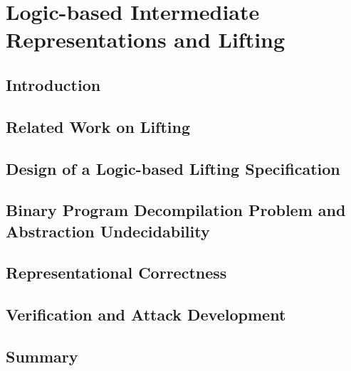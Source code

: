 \chapter{Logic-based Intermediate Representations and Lifting}

\section{Introduction}

\section{Related Work on Lifting}

\section{Design of a Logic-based Lifting Specification}

\section{Binary Program Decompilation Problem and Abstraction Undecidability}

\section{Representational Correctness}

\section{Verification and Attack Development}

\section{Summary}
